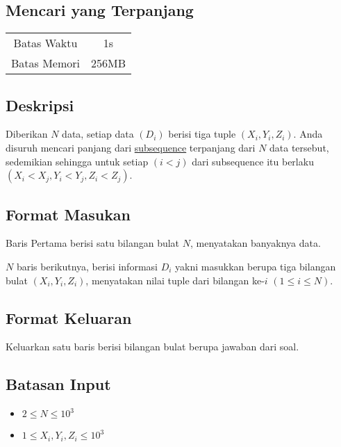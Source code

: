 \documentclass{article}
\begin{document}
\begin{center}
    \section*{Mencari yang Terpanjang} %

    \begin{tabular}{ | c c | }
        \hline
        Batas Waktu  & 1s \\    %
        Batas Memori & 256MB \\  %
        \hline
    \end{tabular}
\end{center}

\subsection*{Deskripsi}

Diberikan $N$ data, setiap data $(D_i)$ berisi tiga tuple $(X_i, Y_i, Z_i)$. Anda disuruh mencari panjang dari \href{https://en.wikipedia.org/wiki/Subsequence}{subsequence} terpanjang dari $N$ data tersebut, sedemikian sehingga untuk setiap $\left(i < j\right)$ dari subsequence itu berlaku $\left(X_i < X_j, Y_i < Y_j, Z_i < Z_j\right)$.

\subsection*{Format Masukan}

Baris Pertama berisi satu bilangan bulat $N$, menyatakan banyaknya data.

$N$ baris berikutnya, berisi informasi $D_i$ yakni masukkan berupa tiga bilangan bulat $(X_i, Y_i, Z_i)$, menyatakan nilai tuple dari bilangan ke-$i$ $(1 \leq i \leq N)$.


\subsection*{Format Keluaran}
Keluarkan satu baris berisi bilangan bulat berupa jawaban dari soal.

\subsection*{Batasan Input}

\begin{itemize}
    \item{$2 \leq N \leq 10^3$}
    \item{$1 \leq X_i, Y_i, Z_i \leq 10^3$}
\end{itemize}
\end{document}
